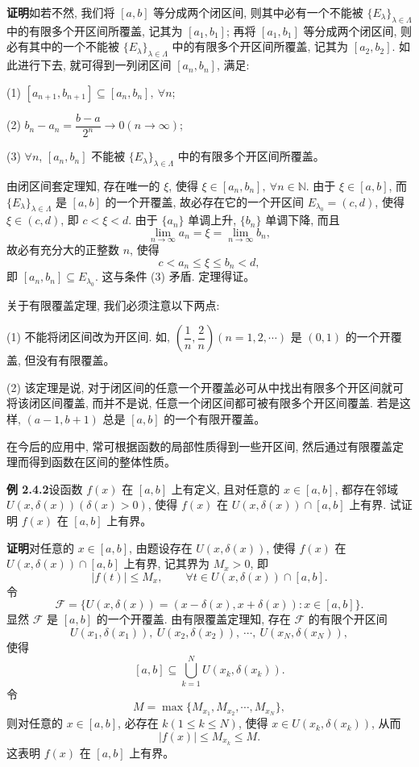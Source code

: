 \documentclass[UTF8,12pt,a4paper,fontset=fandol]{ctexart}
\begin{document}
\noindent\textbf{证明}\quad 如若不然, 我们将 $[a,b]$ 等分成两个闭区间, 则其中必有一个不能被 $\{E_\lambda\}_{\lambda\in\Lambda}$ 中的有限多个开区间所覆盖, 记其为 $[a_1,b_1]$; 再将 $[a_1,b_1]$ 等分成两个闭区间, 则必有其中的一个不能被 $\{E_\lambda\}_{\lambda\in\Lambda}$ 中的有限多个开区间所覆盖, 记其为 $[a_2,b_2]$. 如此进行下去, 就可得到一列闭区间 $[a_n,b_n]$, 满足:

(1) $[a_{n+1},b_{n+1}]\subseteq[a_n,b_n],\ \forall n$;

(2) $b_n-a_n=\dfrac{b-a}{2^n}\to0(n\to\infty)$;

(3) $\forall n$, $[a_n,b_n]$ 不能被 $\{E_\lambda\}_{\lambda\in\Lambda}$ 中的有限多个开区间所覆盖。

由闭区间套定理知, 存在唯一的 $\xi$, 使得 $\xi\in[a_n,b_n],\ \forall n\in\mathbb{N}$. 由于 $\xi\in[a,b]$, 而 $\{E_\lambda\}_{\lambda\in\Lambda}$ 是 $[a,b]$ 的一个开覆盖, 故必存在它的一个开区间 $E_{\lambda_0}=(c,d)$, 使得 $\xi\in(c,d)$, 即 $c<\xi<d$. 由于 $\{a_n\}$ 单调上升, $\{b_n\}$ 单调下降, 而且
\[
  \lim_{n\to\infty}a_n=\xi=\lim_{n\to\infty}b_n,
\]
故必有充分大的正整数 $n$, 使得
\[
  c<a_n\leqslant\xi\leqslant b_n<d,
\]
即 $[a_n,b_n]\subseteq E_{\lambda_0}$. 这与条件 (3) 矛盾. 定理得证。

关于有限覆盖定理, 我们必须注意以下两点:

(1) 不能将闭区间改为开区间. 如, $\left(\dfrac1n,\dfrac2n\right)(n=1,2,\cdots)$ 是 $(0,1)$ 的一个开覆盖, 但没有有限覆盖。

(2) 该定理是说, 对于闭区间的任意一个开覆盖必可从中找出有限多个开区间就可将该闭区间覆盖, 而并不是说, 任意一个闭区间都可被有限多个开区间覆盖. 若是这样, $(a-1,b+1)$ 总是 $[a,b]$ 的一个有限开覆盖。

在今后的应用中, 常可根据函数的局部性质得到一些开区间, 然后通过有限覆盖定理而得到函数在区间的整体性质。

\noindent\textbf{例 2.4.2}\quad 设函数 $f(x)$ 在 $[a,b]$ 上有定义, 且对任意的 $x\in[a,b]$, 都存在邻域 $U(x,\delta(x))(\delta(x)>0)$, 使得 $f(x)$ 在 $U(x,\delta(x))\cap[a,b]$ 上有界. 试证明 $f(x)$ 在 $[a,b]$ 上有界。

\noindent\textbf{证明}\quad 对任意的 $x\in[a,b]$, 由题设存在 $U(x,\delta(x))$, 使得 $f(x)$ 在 $U(x,\delta(x))\cap[a,b]$ 上有界, 记其界为 $M_x>0$, 即
\[
  |f(t)|\leqslant M_x,\qquad \forall t\in U(x,\delta(x))\cap[a,b].
\]
令
\[
  \mathcal{F}=\{U(x,\delta(x))=(x-\delta(x),x+\delta(x)):x\in[a,b]\}.
\]
显然 $\mathcal{F}$ 是 $[a,b]$ 的一个开覆盖. 由有限覆盖定理知, 存在 $\mathcal{F}$ 的有限个开区间
\[
  U(x_1,\delta(x_1)),\ U(x_2,\delta(x_2)),\ \cdots,\ U(x_N,\delta(x_N)),
\]
使得
\[
  [a,b]\subseteq\bigcup_{k=1}^N U(x_k,\delta(x_k)).
\]
令
\[
  M=\max\{M_{x_1},M_{x_2},\cdots,M_{x_N}\},
\]
则对任意的 $x\in[a,b]$, 必存在 $k(1\leqslant k\leqslant N)$, 使得 $x\in U(x_k,\delta(x_k))$, 从而
\[
  |f(x)|\leqslant M_{x_k}\leqslant M.
\]
这表明 $f(x)$ 在 $[a,b]$ 上有界。
\end{document}
